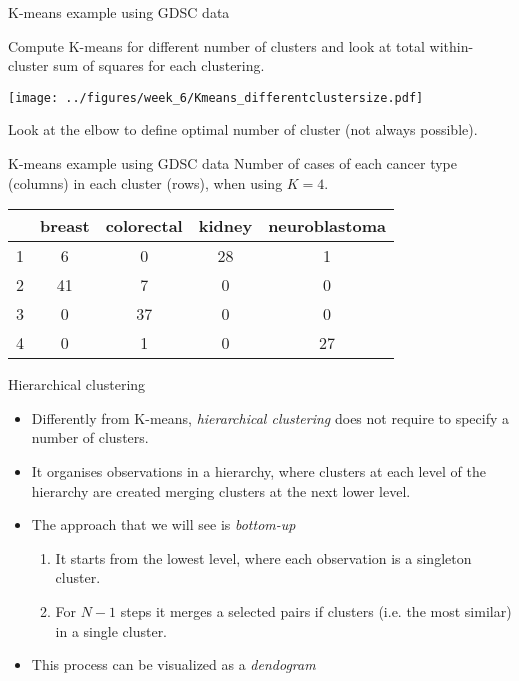 \documentclass[notes]{beamer}          %
\begin{document}
\begin{frame}{K-means example using GDSC data}

Compute K-means for different number of clusters and look at total within-cluster sum of squares for each clustering. 
\begin{center}
\texttt{[image: ../figures/week\_6/Kmeans\_differentclustersize.pdf]}  
\end{center}
Look at the elbow to define optimal number of cluster (not always possible).
\end{frame}

\begin{frame}{K-means example using GDSC data}
Number of cases of each cancer type (columns) in each cluster (rows), when using $K=4$.
\begin{center}
\begin{tabular}{ c | | c | c | c | c }
& breast & colorectal & kidney & neuroblastoma \\
\hline \hline
1 & 6 & 0 & 28 & 1 \\ 
2 & 41 & 7 & 0 & 0\\
3 & 0 & 37 & 0 & 0\\
4 & 0 & 1 & 0 & 27\\
\end{tabular}
\end{center}
\end{frame}



\begin{frame}{Hierarchical clustering}
\begin{itemize}
\item Differently from K-means, \textit{hierarchical clustering} does not require to specify a number of clusters.
\item It organises observations in a hierarchy, where clusters at each level of the hierarchy are created merging clusters at the next lower level.
\item The approach that we will see is \textit{bottom-up}
\begin{enumerate}
 \item It starts from the lowest level, where each observation is a singleton cluster.
 \item For $N-1$ steps it merges a selected pairs if clusters (i.e. the most similar) in a single cluster.
\end{enumerate}
\item This process can be visualized as a \textit{dendogram}
\end{itemize}
\end{frame}
\end{document}
